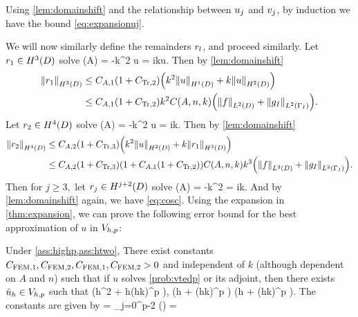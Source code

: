 Using \cref{lem:domainshift} and the relationship between $u_{j}$ and $v_{j}$, by induction we have the bound \cref{eq:expansionuj}.

We will now similarly define the remainders $r_{l}$, and proceed similarly.
Let $\ro \in \HthD$ solve
\beqs
\grad \cdot \mleft(A\grad \ro\mright) = -k^2 u
\eeqs
\beqs
\dn \ro = iku.
\eeqs
Then by \cref{lem:domainshift}
\begin{align*}
\NHthD{\ro} &\leq \CAo\mleft(1+\CTrt\mright)\mleft(k^2\NHoD{u} + k\NHtD{u}\mright)\\
&\leq \CAo\mleft(1+\CTrt\mright)k^2\CAnk\mleft(\NLtD{f} + \NLtGI{\gI}\mright).
\end{align*}
Let $\rt \in \HfD$ solve
\beqs
\grad \cdot \mleft(A\grad \rt\mright) = -k^2 u
\eeqs
\beqs
\dn \rt = ik\ro.
\eeqs
Then by \cref{lem:domainshift}
\begin{align*}
\NHfD{\rt} &\leq \CAt\mleft(1+\CTrth\mright)\mleft(k^2\NHtD{u} + k\NHthD{\ro}\mright)\\
&\leq \CAt\mleft(1+\CTrth\mright)\mleft(1 + \CAo\mleft(1+\CTrt\mright)\mright)\CAnk k^3\mleft(\NLtD{f} + \NLtGI{\gI}\mright).
\end{align*}
Then for $j \geq 3,$ let $\rj \in \HjptD$ solve
\beqs
\grad \cdot \mleft(A\grad \rt\mright) = -k^2 \rjmt
\eeqs
\beqs
\dn \rj = ik\rjmo.
\eeqs
And by \cref{lem:domainshift} again, we have \eqref{eq:cosc}.
\epf
{}
Using the expansion in \cref{thm:expansion}, we can prove the following error bound for the best approximation of $u$ in $V_{h,p}$:

\label{lem:bestapprox}
Under \cref{ass:highp,ass:htwo}, There exist constants $C_{\mathrm{FEM},1}, C_{\mathrm{FEM},2}, C_{\mathrm{FEM},1}, C_{\mathrm{FEM},2} > 0$ and independent of $k$ (although dependent on $A$ and $n$) such that if $u$ solves \cref{prob:vtedp} or its adjoint, then there exists $\hat{u}_{h} \in V_{h,p}$ such that
\beq\label{eq:bestapproxL2}
 \leq \mleft(\CFEMo h^2 + \CFEMt \CAnk h\mleft(hk\mright)^p \mright)\Cfg,
\eeq
\beq\label{eq:bestapproxH1}
 \leq \mleft(\CFEMo h + \CFEMt \CAnk \mleft(hk\mright)^p \mright)\Cfg \tand
\eeq
\beq\label{eq:bestapproxW}
 \mleft(\CFEMo h + \CFEMt \CAnk \mleft(hk\mright)^p \mright)\Cfg.
\eeq
The constants are given by
\beq\label{eq:CFEMs}
\CFEMo = \sum_{j=0}^{p-2} \Pj\mleft(\mright) \tand \CFEMt = \Cosc
\eeq
\ele

